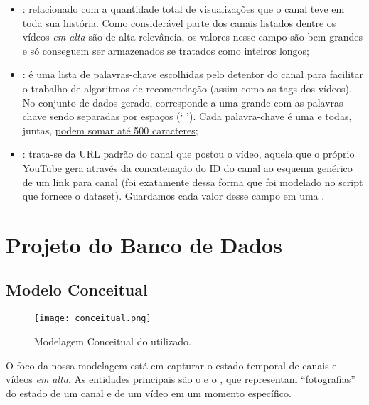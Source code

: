 \begin{itemize}
    \item {}: relacionado com a quantidade total de visualizações que o canal teve em toda sua história. Como considerável parte dos canais listados dentre os vídeos \emph{em alta} são de alta relevância, os valores nesse campo são bem grandes e só conseguem ser armazenados se tratados como inteiros longos;
    \item {}: é uma lista de palavras-chave escolhidas pelo detentor do canal para facilitar o trabalho de algoritmos de recomendação (assim como as tags dos vídeos). No conjunto de dados gerado, corresponde a uma grande  com as palavras-chave sendo separadas por espaços (` '). Cada palavra-chave é uma  e todas, juntas, \href{https://developers.google.com/youtube/v3/docs/channels?hl=pt-br#brandingSettings.channel.keywords}{podem somar até 500 caracteres}\cite{google_youtube_channels};
    \item {}: trata-se da URL padrão do canal que postou o vídeo, aquela que o próprio YouTube gera através da concatenação do ID do canal ao esquema genérico de um link para canal (foi exatamente dessa forma que foi modelado no script que fornece o dataset). Guardamos cada valor desse campo em uma .




  \end{itemize}

\chapter{Projeto do Banco de Dados}

\section{Modelo Conceitual}

  \vspace{2cm}
  \begin{figure}[H]
    \centering
    \texttt{[image: conceitual.png]}
    \caption{Modelagem Conceitual do  utilizado.}
  \end{figure}


  O foco da nossa modelagem está em capturar o estado temporal de canais e vídeos \emph{em alta}. As entidades principais são o  e o , que representam ``fotografias'' do estado de um canal e de um vídeo em um momento específico.

